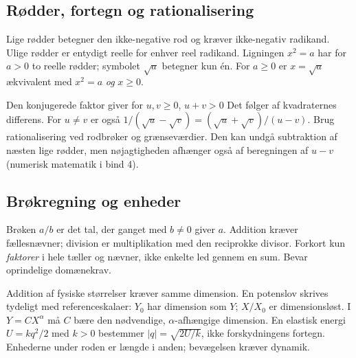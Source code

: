 \subsection{Rødder, fortegn og rationalisering}
Lige rødder betegner den ikke-negative rod og kræver ikke-negativ radikand.
Ulige rødder er entydigt reelle for enhver reel radikand.
Ligningen $x^2=a$ har for $a>0$ to reelle rødder; symbolet $\sqrt a$
betegner kun én. For $a\ge0$ er $x=\sqrt a$ ækvivalent med
$x^2=a$ \emph{og} $x\ge0$.

Den konjugerede faktor giver for $u,v\ge0$, $u+v>0$
Det følger af kvadraternes differens. For $u\ne v$ er også
$1/(\sqrt u-\sqrt v)=(\sqrt u+\sqrt v)/(u-v)$.
Brug rationalisering ved rodbrøker og grænseværdier. Den kan undgå
subtraktion af næsten lige rødder, men nøjagtigheden afhænger også af
beregningen af $u-v$ (numerisk matematik i bind 4).

\subsection{Brøkregning og enheder}
Brøken $a/b$ er det tal, der ganget med $b\ne0$ giver $a$.
Addition kræver fællesnævner; division er multiplikation med den
reciprokke divisor. Forkort kun \emph{faktorer} i hele tæller og nævner,
ikke enkelte led gennem en sum. Bevar oprindelige domænekrav.

Addition af fysiske størrelser kræver samme dimension. En potenslov
skrives tydeligt med referenceskalaer:
$Y_0$ har dimension som $Y$; $X/X_0$ er dimensionsløst.
I $Y=CX^\alpha$ må $C$ bære den nødvendige, $\alpha$-afhængige dimension.
En elastisk energi $U=kq^2/2$ med $k>0$ bestemmer
$|q|=\sqrt{2U/k}$, ikke forskydningens fortegn. Enhederne under roden er
længde i anden; bevægelsen kræver dynamik.

